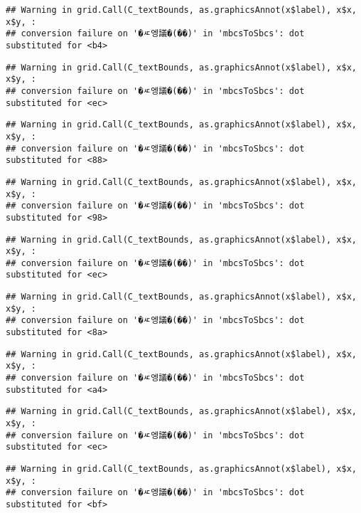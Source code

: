 \documentclass[
]{article}
\begin{document}
\begin{verbatim}
## Warning in grid.Call(C_textBounds, as.graphicsAnnot(x$label), x$x, x$y, :
## conversion failure on '�ㅼ엥議�(��)' in 'mbcsToSbcs': dot substituted for <b4>
\end{verbatim}

\begin{verbatim}
## Warning in grid.Call(C_textBounds, as.graphicsAnnot(x$label), x$x, x$y, :
## conversion failure on '�ㅼ엥議�(��)' in 'mbcsToSbcs': dot substituted for <ec>
\end{verbatim}

\begin{verbatim}
## Warning in grid.Call(C_textBounds, as.graphicsAnnot(x$label), x$x, x$y, :
## conversion failure on '�ㅼ엥議�(��)' in 'mbcsToSbcs': dot substituted for <88>
\end{verbatim}

\begin{verbatim}
## Warning in grid.Call(C_textBounds, as.graphicsAnnot(x$label), x$x, x$y, :
## conversion failure on '�ㅼ엥議�(��)' in 'mbcsToSbcs': dot substituted for <98>
\end{verbatim}

\begin{verbatim}
## Warning in grid.Call(C_textBounds, as.graphicsAnnot(x$label), x$x, x$y, :
## conversion failure on '�ㅼ엥議�(��)' in 'mbcsToSbcs': dot substituted for <ec>
\end{verbatim}

\begin{verbatim}
## Warning in grid.Call(C_textBounds, as.graphicsAnnot(x$label), x$x, x$y, :
## conversion failure on '�ㅼ엥議�(��)' in 'mbcsToSbcs': dot substituted for <8a>
\end{verbatim}

\begin{verbatim}
## Warning in grid.Call(C_textBounds, as.graphicsAnnot(x$label), x$x, x$y, :
## conversion failure on '�ㅼ엥議�(��)' in 'mbcsToSbcs': dot substituted for <a4>
\end{verbatim}

\begin{verbatim}
## Warning in grid.Call(C_textBounds, as.graphicsAnnot(x$label), x$x, x$y, :
## conversion failure on '�ㅼ엥議�(��)' in 'mbcsToSbcs': dot substituted for <ec>
\end{verbatim}

\begin{verbatim}
## Warning in grid.Call(C_textBounds, as.graphicsAnnot(x$label), x$x, x$y, :
## conversion failure on '�ㅼ엥議�(��)' in 'mbcsToSbcs': dot substituted for <bf>
\end{verbatim}
\end{document}
